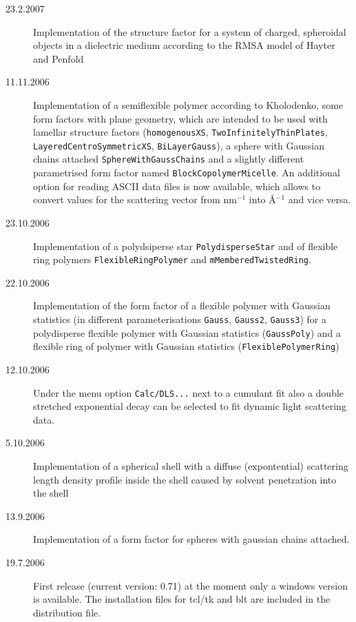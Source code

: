 \begin{description}
    \item[23.2.2007] Implementation of the structure factor for a system of charged, spheroidal objects in a
    dielectric medium according to the RMSA model of Hayter and Penfold
    \item[11.11.2006]  Implementation of a semiflexible polymer according to Kholodenko,
    some form factors with plane geometry, which are intended to be used with lamellar structure factors
    (\texttt{homogenousXS}, \texttt{TwoInfinitelyThinPlates},
     \texttt{LayeredCentroSymmetricXS}, \texttt{BiLayerGauss}), a sphere with Gaussian chains attached
    \texttt{SphereWithGaussChains} and a slightly different parametrised form factor named
    \texttt{BlockCopolymerMicelle}.
    An additional option for reading ASCII data files is now available,
    which allows to convert values for the scattering vector from
    nm$^{-1}$ into \AA$^{-1}$ and vice versa. \sloppy
    \item[23.10.2006] Implementation of a polydsiperse star \texttt{PolydisperseStar} and
    of flexible ring polymers \texttt{FlexibleRingPolymer} and \texttt{mMemberedTwistedRing}.
    \item[22.10.2006] Implementation of the form factor of a flexible polymer with Gaussian statistics
    (in different parameterisations \verb"Gauss", \verb"Gauss2", \verb"Gauss3") for a polydisperse flexible
    polymer with Gaussian statistics (\verb"GaussPoly") and a flexible ring of polymer with Gaussian statistics
    (\verb"FlexiblePolymerRing")
    \item[12.10.2006] Under the menu option \verb"Calc/DLS..." next to a cumulant fit also
      a double stretched exponential decay can be selected to fit dynamic light scattering data.
    \item[5.10.2006] Implementation of a spherical shell with a diffuse
      (expontential) scattering length density profile inside the shell
      caused by solvent penetration into the shell
    \item[13.9.2006] Implementation of a form factor for spheres
      with gaussian chains attached.
    \item[19.7.2006] First release (current version: 0.71)
      at the moment only a windows version is available. The
      installation files for tcl/tk and blt are included in the
      distribution file.
\end{description}
